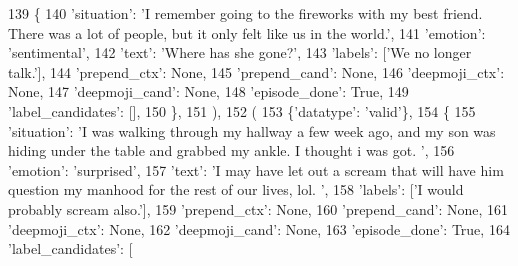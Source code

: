\begin{DoxyCode}
139                     \{
140                         \textcolor{stringliteral}{'situation'}: \textcolor{stringliteral}{'I remember going to the fireworks with my best friend. There was a
       lot of people, but it only felt like us in the world.'},
141                         \textcolor{stringliteral}{'emotion'}: \textcolor{stringliteral}{'sentimental'},
142                         \textcolor{stringliteral}{'text'}: \textcolor{stringliteral}{'Where has she gone?'},
143                         \textcolor{stringliteral}{'labels'}: [\textcolor{stringliteral}{'We no longer talk.'}],
144                         \textcolor{stringliteral}{'prepend\_ctx'}: \textcolor{keywordtype}{None},
145                         \textcolor{stringliteral}{'prepend\_cand'}: \textcolor{keywordtype}{None},
146                         \textcolor{stringliteral}{'deepmoji\_ctx'}: \textcolor{keywordtype}{None},
147                         \textcolor{stringliteral}{'deepmoji\_cand'}: \textcolor{keywordtype}{None},
148                         \textcolor{stringliteral}{'episode\_done'}: \textcolor{keyword}{True},
149                         \textcolor{stringliteral}{'label\_candidates'}: [],
150                     \},
151                 ),
152                 (
153                     \{\textcolor{stringliteral}{'datatype'}: \textcolor{stringliteral}{'valid'}\},
154                     \{
155                         \textcolor{stringliteral}{'situation'}: \textcolor{stringliteral}{'I was walking through my hallway a few week ago, and my son was
       hiding under the table and grabbed my ankle. I thought i was got. '},
156                         \textcolor{stringliteral}{'emotion'}: \textcolor{stringliteral}{'surprised'},
157                         \textcolor{stringliteral}{'text'}: \textcolor{stringliteral}{'I may have let out a scream that will have him question my manhood for the
       rest of our lives, lol. '},
158                         \textcolor{stringliteral}{'labels'}: [\textcolor{stringliteral}{'I would probably scream also.'}],
159                         \textcolor{stringliteral}{'prepend\_ctx'}: \textcolor{keywordtype}{None},
160                         \textcolor{stringliteral}{'prepend\_cand'}: \textcolor{keywordtype}{None},
161                         \textcolor{stringliteral}{'deepmoji\_ctx'}: \textcolor{keywordtype}{None},
162                         \textcolor{stringliteral}{'deepmoji\_cand'}: \textcolor{keywordtype}{None},
163                         \textcolor{stringliteral}{'episode\_done'}: \textcolor{keyword}{True},
164                         \textcolor{stringliteral}{'label\_candidates'}: [

\end{DoxyCode}
